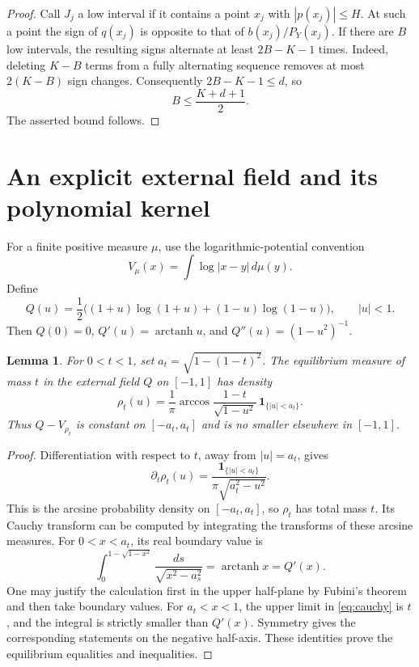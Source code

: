\documentclass[11pt]{article}
\newtheorem{lemma}[theorem]{Lemma}
\theoremstyle{definition}
\numberwithin{equation}{section}
\DeclareMathOperator{\arctanh}{arctanh}
\newcommand{\one}{\mathbf 1}
\begin{document}
\begin{proof}
Call \(J_j\) a low interval if it contains a point \(x_j\) with
\(|p(x_j)|\le H\). At such a point the sign of \(q(x_j)\) is opposite
to that of \(b(x_j)/P_Y(x_j)\).
If there are \(B\) low intervals, the resulting signs alternate at
least \(2B-K-1\) times. Indeed, deleting \(K-B\) terms from a fully
alternating sequence removes at most \(2(K-B)\) sign changes.
Consequently \(2B-K-1\le d\), so
\begin{equation}\label{eq:low-interval-count}
 B\le\frac{K+d+1}{2}.
\end{equation}
The asserted bound follows.
\end{proof}

\section{An explicit external field and its polynomial kernel}
\label{sec:kernel}

For a finite positive measure \(\mu\), use the logarithmic-potential
convention
\[
 V_\mu(x)=\int\log|x-y|\,d\mu(y).
\]
Define
\begin{equation}\label{eq:field}
 Q(u)=\frac12\bigl((1+u)\log(1+u)+(1-u)\log(1-u)\bigr),
 \qquad |u|<1.
\end{equation}
Then \(Q(0)=0\), \(Q'(u)=\arctanh u\), and
\(Q''(u)=(1-u^2)^{-1}\).

\begin{lemma}\label{lem:equilibrium}
For \(0<t<1\), set \(a_t=\sqrt{1-(1-t)^2}\).
The equilibrium measure of mass \(t\) in the external field \(Q\)
on \([-1,1]\) has density
\begin{equation}\label{eq:density}
 \rho_t(u)=\frac1\pi
 \arccos\frac{1-t}{\sqrt{1-u^2}}\,
 \one_{\{|u|<a_t\}}.
\end{equation}
Thus \(Q-V_{\rho_t}\) is constant on \([-a_t,a_t]\) and is no smaller
elsewhere in \([-1,1]\).
\end{lemma}

\begin{proof}
Differentiation with respect to \(t\), away from \(|u|=a_t\), gives
\begin{equation}\label{eq:density-derivative}
 \partial_t\rho_t(u)=
 \frac{\one_{\{|u|<a_t\}}}{\pi\sqrt{a_t^2-u^2}}.
\end{equation}
This is the arcsine probability density on \([-a_t,a_t]\), so
\(\rho_t\) has total mass \(t\).
Its Cauchy transform can be computed by integrating the transforms
of these arcsine measures. For \(0<x<a_t\), its real boundary value is
\begin{equation}\label{eq:cauchy}
 \int_0^{1-\sqrt{1-x^2}}\frac{ds}{\sqrt{x^2-a_s^2}}
 =\arctanh x=Q'(x).
\end{equation}
One may justify the calculation first in the upper half-plane by
Fubini's theorem and then take boundary values.
For \(a_t<x<1\), the upper limit in \eqref{eq:cauchy} is \(t\),
and the integral is strictly smaller than \(Q'(x)\).
Symmetry gives the corresponding statements on the negative
half-axis. These identities prove the equilibrium equalities and
inequalities.
\end{proof}
\end{document}
